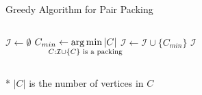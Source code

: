 \begin{frame}{Greedy Algorithm for Pair Packing}
\begin{columns}[T]

\begin{column}{.5\linewidth}


\begin{algorithm}[H]
\caption{Greedy Algorithm}
\begin{algorithmic}[1]
\STATE $\mathcal{I} \gets \emptyset$
\STATE
$C_{min} \gets \smashoperator{\argmin\limits_{C : \mathcal{I} \cup \{C\} \text{ is a packing }}}|C|$
\STATE $\mathcal{I} \gets \mathcal{I} \cup \{ C_{min} \}$
\ENDWHILE
\RETURN $\mathcal{I}$
\end{algorithmic}
\end{algorithm}

\end{column}\hfill\begin{column}{.5\linewidth}

\addtocounter{algorithm}{-1}


\end{column}\end{columns}
\vfill
* $|C|$ is the number of vertices in $C$
\end{frame}